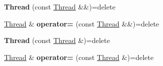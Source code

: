 \begin{DoxyCompactItemize}
\mbox{\label{classThread_a9c8be569889e6acc065a9db76f738952}} 
{\bfseries Thread} (const \hyperlink{classThread}{Thread} \&\&)=delete
\item 
\mbox{\label{classThread_ab6968c245fad4970965b3bf9f6027642}} 
\hyperlink{classThread}{Thread} \& {\bfseries operator=} (const \hyperlink{classThread}{Thread} \&\&)=delete
\item 
\mbox{\label{classThread_a71c9b9c8fb2e87eb14279f6233a83143}} 
{\bfseries Thread} (const \hyperlink{classThread}{Thread} \&)=delete
\item 
\mbox{\label{classThread_a832b2ddff787923f27430d95df55c83d}} 
\hyperlink{classThread}{Thread} \& {\bfseries operator=} (const \hyperlink{classThread}{Thread} \&)=delete
\end{DoxyCompactItemize}
